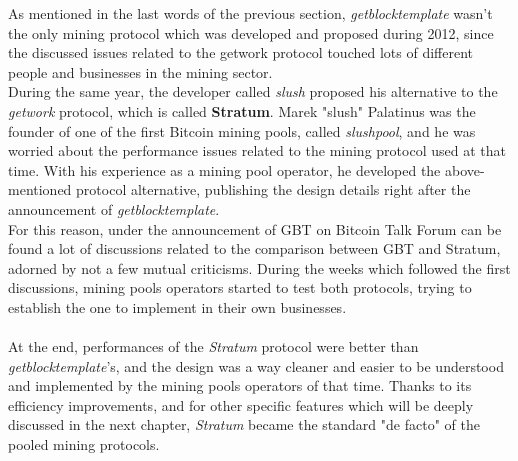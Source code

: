 As mentioned in the last words of the previous section, \textit{getblocktemplate} wasn't the only mining protocol which was developed and proposed during 2012, since the discussed issues related to the getwork protocol touched lots of different people and businesses in the mining sector.\\
During the same year, the developer called \textit{slush} proposed his alternative to the \textit{getwork} protocol, which is called \textbf{Stratum}. 
Marek "slush" Palatinus was the founder of one of the first Bitcoin mining pools, called \textit{slushpool}, and he was worried about the performance issues related to the mining protocol used at that time. With his experience as a mining pool operator, he developed the above-mentioned protocol alternative, publishing the design details right after the announcement of \textit{getblocktemplate}.\\
For this reason, under the announcement of GBT on Bitcoin Talk Forum can be found a lot of discussions related to the comparison between GBT and Stratum, adorned by not a few mutual criticisms.
During the weeks which followed the first discussions, mining pools operators started to test both protocols, trying to establish the one to implement in their own businesses.\\\\
At the end, performances of the \textit{Stratum} protocol were better than \textit{getblocktemplate}'s, and the design was a way cleaner and easier to be understood and implemented by the mining pools operators of that time.
Thanks to its efficiency improvements,  and for other specific features which will be deeply discussed in the next chapter, \textit{Stratum} became the standard "de facto" of the pooled mining protocols.  

